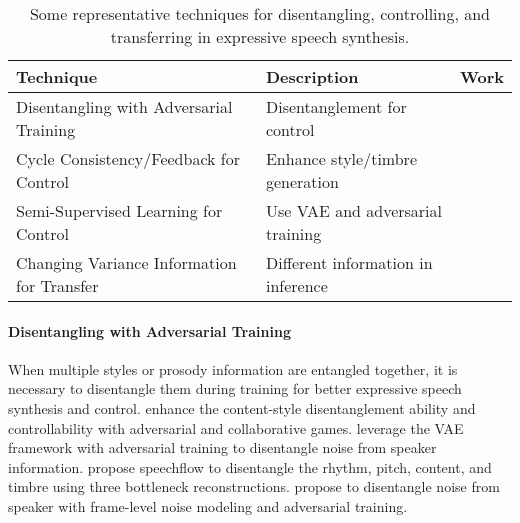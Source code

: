 \documentclass{article}
\begin{document}
\begin{table}[h!]
\small
	\caption{Some representative techniques for disentangling, controlling, and transferring in expressive speech synthesis.}
	\centering
	\begin{tabular}{ l | l | l}
	\toprule
	Technique & Description &  Work  \\
	\midrule
    Disentangling with Adversarial Training & Disentanglement for control   & \cite{ma2018neural,hsu2019disentangling,qian2020unsupervised,zhang2020denoising}\\
    Cycle Consistency/Feedback for Control & Enhance style/timbre generation & \cite{liu2018improving,whitehill2020multi,liu2020expressive,cai2020speaker,li2021controllable} \\
    Semi-Supervised Learning for Control & Use VAE and adversarial training & \cite{habib2019semi,hsu2018hierarchical,hsu2019disentangling,zhang2020denoising,shechtman2021supervised}  \\
    Changing Variance Information for Transfer & Different information in inference  & \cite{skerry2018towards,wang2018style,jia2018transfer,zhang2019learningb,chen2021adaspeech} \\
	\bottomrule
	\end{tabular}
	\label{tab_expressiveness_technique}
\end{table}

\paragraph{Disentangling with Adversarial Training} When multiple styles or prosody information are entangled together, it is necessary to disentangle them during training for better expressive speech synthesis and control. \citet{ma2018neural} enhance the content-style disentanglement ability and controllability with adversarial and collaborative games. \citet{hsu2019disentangling} leverage the VAE framework with adversarial training to disentangle noise from speaker information. \citet{qian2020unsupervised} propose speechflow to disentangle the rhythm, pitch, content, and timbre using three bottleneck reconstructions. \citet{zhang2020denoising} propose to disentangle noise from speaker with frame-level noise modeling and adversarial training.
\end{document}
